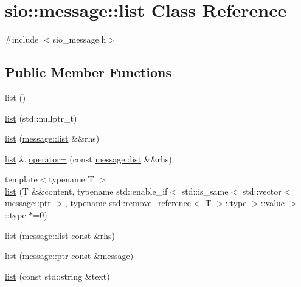 \hypertarget{classsio_1_1message_1_1list}{}\section{sio\+:\+:message\+:\+:list Class Reference}
\label{classsio_1_1message_1_1list}


{\ttfamily \#include $<$sio\+\_\+message.\+h$>$}

\subsection*{Public Member Functions}
\begin{DoxyCompactItemize}
\item 
\hyperlink{classsio_1_1message_1_1list_a6f769d1a16d9bbb45569cdaaeba4ef7a}{list} ()
\item 
\hyperlink{classsio_1_1message_1_1list_aa7ef198ac1c766cf693ce948b9f90afa}{list} (std\+::nullptr\+\_\+t)
\item 
\hyperlink{classsio_1_1message_1_1list_ab95f7a785ca987fd8bb53486a62256d3}{list} (\hyperlink{classsio_1_1message_1_1list}{message\+::list} \&\&rhs)
\item 
\hyperlink{classsio_1_1message_1_1list}{list} \& \hyperlink{classsio_1_1message_1_1list_aa03648f0cfb2945889ce6570f85e3a90}{operator=} (const \hyperlink{classsio_1_1message_1_1list}{message\+::list} \&\&rhs)
\item 
{\footnotesize template$<$typename T $>$ }\\\hyperlink{classsio_1_1message_1_1list_a9eef9ae52817678c17eb3deeef0da16b}{list} (T \&\&content, typename std\+::enable\+\_\+if$<$ std\+::is\+\_\+same$<$ std\+::vector$<$ \hyperlink{classsio_1_1message_a6340b6fef57e4516eb17928b1885a615}{message\+::ptr} $>$, typename std\+::remove\+\_\+reference$<$ T $>$\+::type $>$\+::value $>$\+::type $\ast$=0)
\item 
\hyperlink{classsio_1_1message_1_1list_a8b9bb683c5ab75941cb625b4d4a35443}{list} (\hyperlink{classsio_1_1message_1_1list}{message\+::list} const \&rhs)
\item 
\hyperlink{classsio_1_1message_1_1list_ac52420cb9519a2fd0c22471f6dd487b6}{list} (\hyperlink{classsio_1_1message_a6340b6fef57e4516eb17928b1885a615}{message\+::ptr} const \&\hyperlink{classsio_1_1message}{message})
\item 
\hyperlink{classsio_1_1message_1_1list_a22d71cb93f3b80b85933ad5a0558b3a4}{list} (const std\+::string \&text)
\item 

\end{DoxyCompactItemize}
